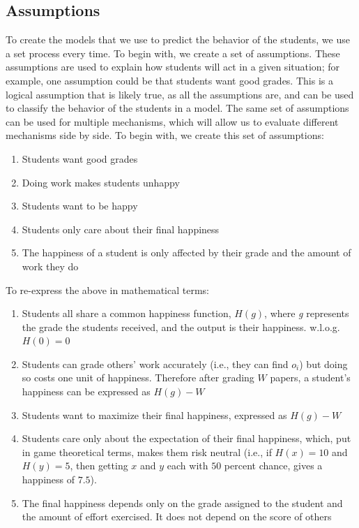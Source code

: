 \documentclass[12pt, Arial]{article}
\begin{document}
\subsection{Assumptions}
To create the models that we use to predict the behavior of the students, we use a set process every time. To begin with, we create a set of assumptions. These assumptions are used to explain how students will act in a given situation; for example, one assumption could be that students want good grades. This is a logical assumption that is likely true, as all the assumptions are, and can be used to classify the behavior of the students in a model. The same set of assumptions can be used for multiple mechanisms, which will allow us to evaluate different mechanisms side by side. To begin with, we create this set of assumptions:
\begin{enumerate}[itemsep=0pt, parsep=0pt]
	\item Students want good grades
	\item Doing work makes students unhappy
	\item Students want to be happy
	\item Students only care about their final happiness
	\item The happiness of a student is only affected by their grade and the amount of work they do
\end{enumerate}
To re-express the above in mathematical terms:
\begin{enumerate}[itemsep=0pt, parsep=0pt]
	\item Students all share a common happiness function, $H(g)$, where \emph{g} represents the grade the students received, and the output is their happiness. w.l.o.g. $H(0)=0$
	\item Students can grade others' work accurately (i.e., they can find $o_i$) but doing so costs one unit of happiness. Therefore after grading $W$ papers, a student's happiness can be expressed as $H(g)-W$
	\item Students want to maximize their final happiness, expressed as $H(g)-W$
	\item Students care only about the expectation of their final happiness, which, put in game theoretical terms, makes them risk neutral (i.e., if $H(x)=10$ and $H(y)=5$, then getting $x$ and $y$ each with $50$ percent chance, gives a happiness of $7.5$).
	\item The final happiness depends only on the grade assigned to the student and the amount of effort exercised. It does not depend on the score of others
\end{enumerate}
\end{document}
